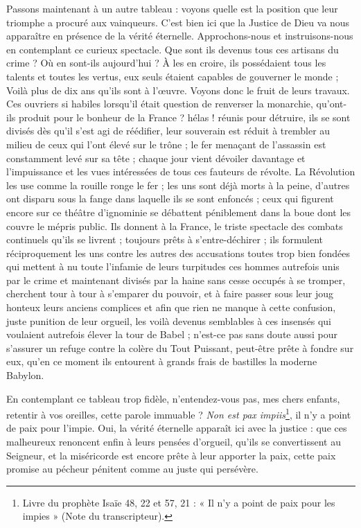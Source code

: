\documentclass[11pt,a4paper]{report}
\begin{document}
Passons maintenant à un autre tableau : voyons quelle est la position que leur triomphe a procuré aux vainqueurs. C'est bien ici que la Justice de Dieu va nous apparaître en présence de la vérité éternelle. Approchons-nous et instruisons-nous en contemplant ce curieux spectacle. Que sont ils devenus tous ces artisans du crime ? Où en sont-ils aujourd'hui ? À les en croire, ils possédaient tous les talents et toutes les vertus, eux seuls étaient capables de gouverner le monde ; Voilà plus de dix ans qu'ils sont à l'œuvre. Voyons donc le fruit de leurs travaux. Ces ouvriers si habiles lorsqu'il était question de renverser la monarchie, qu'ont-ils produit pour le bonheur de la France ? hélas ! réunis pour détruire, ils se sont divisés dès qu'il s'est agi de réédifier, leur souverain est réduit à trembler au milieu de ceux qui l'ont élevé sur le trône ; le fer menaçant de l'assassin est constamment levé sur sa tête ; chaque jour vient dévoiler davantage et l'impuissance et les vues intéressées de tous ces fauteurs de révolte. La Révolution les use comme la rouille ronge le fer ; les uns sont déjà morts à la peine, d'autres ont disparu sous la fange dans laquelle ils se sont enfoncés ; ceux qui figurent encore sur ce théâtre d'ignominie se débattent péniblement dans la boue dont les couvre le mépris public. Ils donnent à la France, le triste spectacle des combats continuels qu'ils se livrent ; toujours prêts à s'entre-déchirer ; ils formulent réciproquement les uns contre les autres des accusations toutes trop bien fondées qui mettent à nu toute l'infamie de leurs turpitudes ces hommes autrefois unis par le crime et maintenant divisés par la haine sans cesse occupés à se tromper, cherchent tour à tour à s'emparer du pouvoir, et à faire passer sous leur joug honteux leurs anciens complices et afin que rien ne manque à cette confusion, juste punition de leur orgueil, les voilà devenus semblables à ces insensés qui voulaient autrefois élever la tour de Babel ; n'est-ce pas sans doute aussi pour s'assurer un refuge contre la colère du Tout Puissant, peut-être prête à fondre sur eux, qu'en ce moment ils entourent à grands frais de bastilles la moderne Babylon.

En contemplant ce tableau trop fidèle, n'entendez-vous pas, mes chers enfants, retentir à vos oreilles, cette parole immuable ? \textit{Non est pax impiis}\footnote{Livre du prophète Isaïe 48, 22 et 57, 21 : « Il n'y a point de paix pour les impies » (Note du transcripteur).}, il n'y a point de paix pour l'impie. Oui, la vérité éternelle apparaît ici avec la justice : que ces malheureux renoncent enfin à leurs pensées d'orgueil, qu'ils se convertissent au Seigneur, et la miséricorde est encore prête à leur apporter la paix, cette paix promise au pécheur pénitent comme au juste qui persévère.
\end{document}

